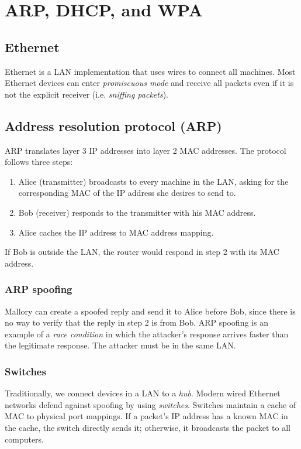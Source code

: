 \chapter{ARP, DHCP, and WPA}

\section{Ethernet}
Ethernet is a LAN implementation that uses wires to connect all machines. Most Ethernet devices can enter \emph{promiscuous mode} and receive all packets even if it is not the explicit receiver (i.e. \emph{sniffing packets}).

\section{Address resolution protocol (ARP)}
ARP translates layer 3 IP addresses into layer 2 MAC addresses. The protocol follows three steps:
\begin{enumerate}
    \item Alice (transmitter) broadcasts to every machine in the LAN, asking for the corresponding MAC of the IP address she desires to send to.
    \item Bob (receiver) responds to the transmitter with his MAC address.
    \item Alice caches the IP address to MAC address mapping.
\end{enumerate}

If Bob is outside the LAN, the router would respond in step 2 with its MAC address.

\subsection{ARP spoofing}
Mallory can create a spoofed reply and send it to Alice before Bob, since there is no way to verify that the reply in step 2 is from Bob. ARP spoofing is an example of a \emph{race condition} in which the attacker's response arrives faster than the legitimate response. The attacker must be in the same LAN.

\subsection{Switches}
Traditionally, we connect devices in a LAN to a \emph{hub}. Modern wired Ethernet networks defend against spoofing by using \emph{switches}. Switches maintain a cache of MAC to physical port mappings. If a packet's IP address has a known MAC in the cache, the switch directly sends it; otherwise, it broadcasts the packet to all computers.

